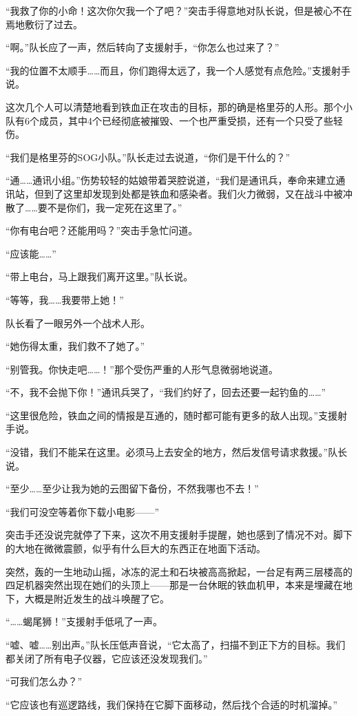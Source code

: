 “我救了你的小命！这次你欠我一个了吧？”突击手得意地对队长说，但是被心不在焉地敷衍了过去。

“啊。”队长应了一声，然后转向了支援射手，“你怎么也过来了？”

“我的位置不太顺手……而且，你们跑得太远了，我一个人感觉有点危险。”支援射手说。

这次几个人可以清楚地看到铁血正在攻击的目标，那的确是格里芬的人形。那个小队有6个成员，其中4个已经彻底被摧毁、一个也严重受损，还有一个只受了些轻伤。

“我们是格里芬的SOG小队。”队长走过去说道，“你们是干什么的？”

“通……通讯小组。”伤势较轻的姑娘带着哭腔说道，“我们是通讯兵，奉命来建立通讯站，但到了这里却发现到处都是铁血和感染者。我们火力微弱，又在战斗中被冲散了……要不是你们，我一定死在这里了。”

“你有电台吧？还能用吗？”突击手急忙问道。

“应该能……”

“带上电台，马上跟我们离开这里。”队长说。

“等等，我……我要带上她！”

队长看了一眼另外一个战术人形。

“她伤得太重，我们救不了她了。”

“别管我。你快走吧……！”那个受伤严重的人形气息微弱地说道。

“不，我不会抛下你！”通讯兵哭了，“我们约好了，回去还要一起钓鱼的……”

“这里很危险，铁血之间的情报是互通的，随时都可能有更多的敌人出现。”支援射手说。

“没错，我们不能呆在这里。必须马上去安全的地方，然后发信号请求救援。”队长说。

“至少……至少让我为她的云图留下备份，不然我哪也不去！”

“我们可没空等着你下载小电影——”

突击手还没说完就停了下来，这次不用支援射手提醒，她也感到了情况不对。脚下的大地在微微震颤，似乎有什么巨大的东西正在地面下活动。

突然，轰的一生地动山摇，冰冻的泥土和石块被高高掀起，一台足有两三层楼高的四足机器突然出现在她们的头顶上——那是一台休眠的铁血机甲，本来是埋藏在地下，大概是附近发生的战斗唤醒了它。

“……蝎尾狮！”支援射手低吼了一声。

“嘘、嘘……别出声。”队长压低声音说，“它太高了，扫描不到正下方的目标。我们都关闭了所有电子仪器，它应该还没发现我们。”

“可我们怎么办？”

“它应该也有巡逻路线，我们保持在它脚下面移动，然后找个合适的时机溜掉。”

